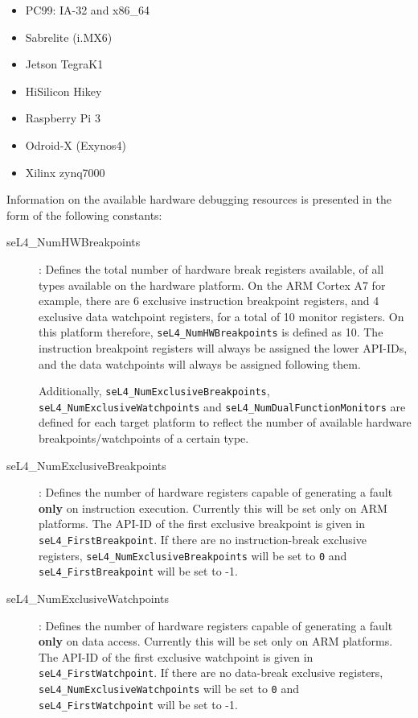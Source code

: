 \begin{itemize}
\item PC99: IA-32 and x86\_64
\item Sabrelite (i.MX6)
\item Jetson TegraK1
\item HiSilicon Hikey
\item Raspberry Pi 3
\item Odroid-X (Exynos4)
\item Xilinx zynq7000
\end{itemize}

Information on the available hardware debugging resources is presented in the form of the following constants:

\begin{description}
\item[seL4\_NumHWBreakpoints]: Defines the total number of hardware break
registers available, of all types available on the hardware platform. On the ARM
Cortex A7 for example, there are 6 exclusive instruction breakpoint registers,
and 4 exclusive data watchpoint registers, for a total of 10 monitor registers.
On this platform therefore, \texttt{seL4\_NumHWBreakpoints} is defined as 10.
The instruction breakpoint registers will always be assigned the lower API-IDs,
and the data watchpoints will always be assigned following them.

Additionally, \texttt{seL4\_NumExclusiveBreakpoints}, \texttt{seL4\_NumExclusiveWatchpoints}
and \texttt{seL4\_NumDualFunctionMonitors}
are defined for each target platform to reflect the number of available
hardware breakpoints/watchpoints of a certain type.

\item[seL4\_NumExclusiveBreakpoints]: Defines the number of hardware registers
capable of generating a fault \textbf{only} on instruction execution. Currently this will be
set only on ARM platforms. The API-ID of the first exclusive breakpoint is given
in \texttt{seL4\_FirstBreakpoint}. If there are no instruction-break exclusive
registers, \texttt{seL4\_NumExclusiveBreakpoints} will be set to \texttt{0} and
\texttt{seL4\_FirstBreakpoint} will be set to -1.

\item[seL4\_NumExclusiveWatchpoints]: Defines the number of hardware registers
capable of generating a fault \textbf{only} on data access. Currently this will be set only
on ARM platforms. The API-ID of the first exclusive watchpoint is given
in \texttt{seL4\_FirstWatchpoint}. If there are no data-break exclusive
registers, \texttt{seL4\_NumExclusiveWatchpoints} will be set to \texttt{0} and
\texttt{seL4\_FirstWatchpoint} will be set to -1.


\end{description}
